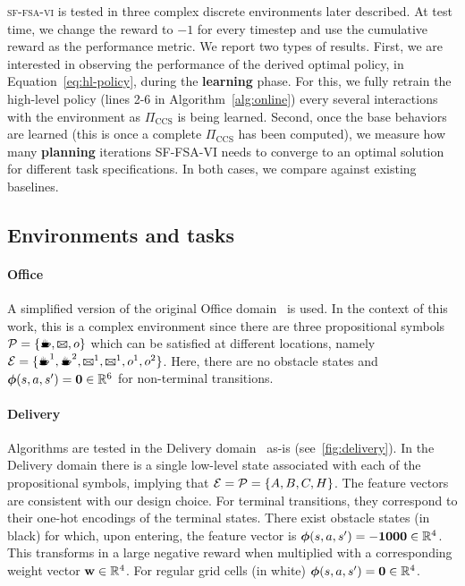 \textsc{sf-fsa-vi} is tested in three complex discrete environments later described. At test time, we change the reward to $-1$ for every timestep and use the cumulative reward as the performance metric. We report two types of results. First, we are interested in observing the performance of the derived optimal policy, in Equation~\eqref{eq:hl-policy}, during the \textbf{learning} phase. For this, we fully retrain the high-level policy (lines 2-6 in Algorithm~\ref{alg:online}) every several interactions with the environment as $\Pi_\text{CCS}$ is being learned. Second, once the base behaviors are learned (this is once a complete $\Pi_\text{CCS}$ has been computed), we measure how many \textbf{planning} iterations SF-FSA-VI needs to converge to an optimal solution for different task specifications. In both cases, we compare against existing baselines.

\subsection{Environments and tasks} 

\paragraph{Office} A simplified version of the original Office domain~\citep{Icarte2018b} is used. In the context of this work, this is a complex environment since there are three propositional symbols $\cP=\{\text{\coffee}, \text{\mail}, o\}$ which can be satisfied at different locations, namely $\cE=\{\text{\coffee}^1, \text{\coffee}^2, \text{\mail}^1, \text{\mail}^1, o^1, o^2\}$. Here, there are no obstacle states and $\boldsymbol{\phi}(s,a,s')=\mathbf{0}\in\mathbb{R}^6$ for non-terminal transitions.

\paragraph{Delivery} Algorithms are tested in the Delivery domain~\citep{Araki2021} as-is (see~\ref{fig:delivery}). In the Delivery domain there is a single low-level state associated with each of the propositional symbols, implying that ${\mathcal{E}=\mathcal{P}=\{A,B,C, H\}}$. The feature vectors are consistent with our design choice. For terminal transitions, they correspond to their one-hot encodings of the terminal states. There exist obstacle states (in black) for which, upon entering,  the feature vector is $\boldsymbol{\phi}(s,a,s')=\mathbf{-1000}\in\mathbb{R}^4$. This transforms in a large negative reward when multiplied with a corresponding weight vector $\mathbf{w}\in\mathbb{R}^{4}$. For regular grid cells (in white) $\boldsymbol{\phi}(s,a,s')=\mathbf{0}\in\mathbb{R}^{4}$. 

